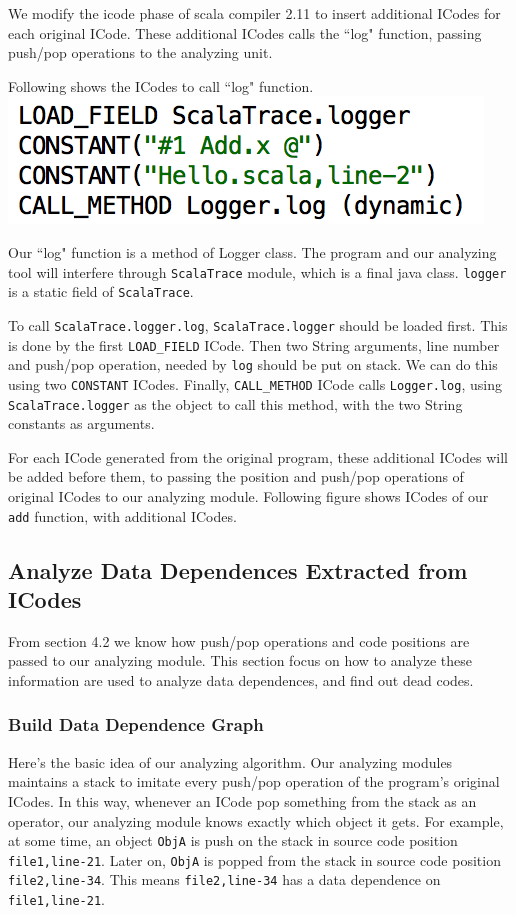 \documentclass{article}[12pt]
\begin{document}
We modify the icode phase of scala compiler 2.11 to insert additional ICodes for each original ICode. These additional ICodes calls the ``log" function, passing push/pop operations to the analyzing unit. 

Following shows the ICodes to call ``log" function. 
\\

\includegraphics[scale=0.5]{figures/figure11}

Our ``log" function is a method of Logger class. The program and our analyzing tool will interfere through \texttt{ScalaTrace} module, which is a final java class. \texttt{logger} is a static field of \texttt{ScalaTrace}. 

To call \texttt{ScalaTrace.logger.log}, \texttt{ScalaTrace.logger} should be loaded first. This is done by the first \texttt{LOAD\_FIELD} ICode. Then two String arguments, line number and push/pop operation, needed by \texttt{log} should be put on stack. We can do this using two \texttt{CONSTANT} ICodes. Finally, \texttt{CALL\_METHOD} ICode calls \texttt{Logger.log}, using \texttt{ScalaTrace.logger} as the object to call this method, with the two String constants as arguments. 

For each ICode generated from the original program, these additional ICodes will be added before them, to passing the position and push/pop operations of original ICodes to our analyzing module. Following figure shows ICodes of our \texttt{add} function, with additional ICodes. 

\subsection{Analyze Data Dependences Extracted from ICodes}   
From section 4.2 we know how push/pop operations and code positions are passed to our analyzing module. This section focus on how to analyze these information are used to analyze data dependences, and find out dead codes. 

\subsubsection{Build Data Dependence Graph}
Here's the basic idea of our analyzing algorithm. 
Our analyzing modules maintains a stack to imitate every push/pop operation of the program's original ICodes. In this way, whenever an ICode pop something from the stack as an operator, our analyzing module knows exactly which object it gets. 
For example, at some time, an object \texttt{ObjA} is push on the stack in source code position \texttt{file1,line-21}. Later on, \texttt{ObjA} is popped from the stack in source code position \texttt{file2,line-34}. This means \texttt{file2,line-34} has a data dependence on \texttt{file1,line-21}. 
\end{document}

